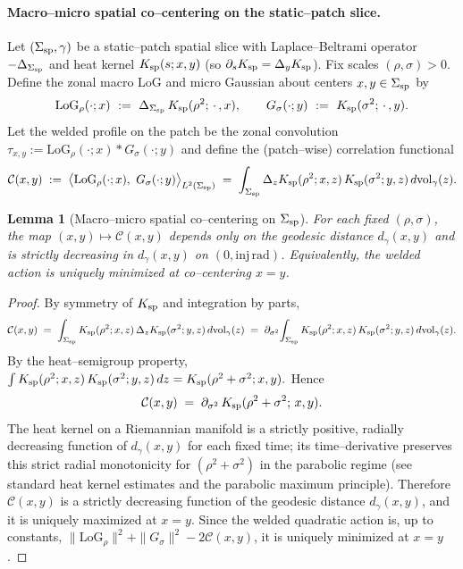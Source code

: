 \documentclass[10pt]{article}
\theoremstyle{definition}
\theoremstyle{plain}
\newtheorem{lemma}{Lemma}[section]
\begin{document}
\paragraph{Macro–micro spatial co–centering on the static–patch slice.}\label{par:uom-main-062}
Let $(\Sigma_{\rm sp},\gamma)$ be a static–patch spatial slice with Laplace–Beltrami operator
$-\Delta_{\Sigma_{\rm sp}}$ and heat kernel $K_{\rm sp}(s;x,y)$ (so $\partial_s K_{\rm sp}=\Delta_y K_{\rm sp}$).
Fix scales $(\rho,\sigma)>0$. Define the zonal macro LoG and micro Gaussian about centers
$x,y\in\Sigma_{\rm sp}$ by
\[
\mathrm{LoG}_\rho(\cdot;x)\ :=\ \Delta_{\Sigma_{\rm sp}}\,K_{\rm sp}(\rho^2;\,\cdot\,,x),\qquad
G_\sigma(\cdot;y)\ :=\ K_{\rm sp}(\sigma^2;\,\cdot\,,y).
\]
Let the welded profile on the patch be the zonal convolution
\(
\tau_{x,y}:=\mathrm{LoG}_\rho(\cdot;x)\ast G_\sigma(\cdot;y)
\)
and define the (patch–wise) correlation functional
\begin{equation}
\label{eq:spatial-corr}
\mathcal C(x,y)\;:=\;\big\langle \mathrm{LoG}_\rho(\cdot;x),\ G_\sigma(\cdot;y)\big\rangle_{L^2(\Sigma_{\rm sp})}
\;=\;\int_{\Sigma_{\rm sp}}\Delta_{z}K_{\rm sp}(\rho^2;x,z)\,K_{\rm sp}(\sigma^2;y,z)\,d\mathrm{vol}_\gamma(z).
\end{equation}

\begin{lemma}[Macro–micro spatial co–centering on $\Sigma_{\rm sp}$]
\label{lem:spatial-cocenter-static}
For each fixed $(\rho,\sigma)$, the map $(x,y)\mapsto \mathcal C(x,y)$ depends only on the geodesic
distance $d_\gamma(x,y)$ and is strictly decreasing in $d_\gamma(x,y)$ on $(0,\mathrm{inj\,rad})$.
Equivalently, the welded action is uniquely minimized at co–centering $x=y$.
\end{lemma}

\begin{proof}
By symmetry of $K_{\rm sp}$ and integration by parts,
\[
\mathcal C(x,y)\;=\;\int_{\Sigma_{\rm sp}}K_{\rm sp}(\rho^2;x,z)\,\Delta_{z}K_{\rm sp}(\sigma^2;y,z)\,d\mathrm{vol}_\gamma(z)
\;=\;\partial_{\sigma^2}\!\int_{\Sigma_{\rm sp}} K_{\rm sp}(\rho^2;x,z)\,K_{\rm sp}(\sigma^2;y,z)\,d\mathrm{vol}_\gamma(z).
\]
By the heat–semigroup property,
\(
\int K_{\rm sp}(\rho^2;x,z)\,K_{\rm sp}(\sigma^2;y,z)\,dz=K_{\rm sp}(\rho^2+\sigma^2;x,y).
\)
Hence
\begin{equation}
\label{eq:kernel-derivative}
\mathcal C(x,y)\;=\;\partial_{\sigma^2}\,K_{\rm sp}(\rho^2+\sigma^2;\,x,y).
\end{equation}
The heat kernel on a Riemannian manifold is a strictly positive, radially decreasing function of
$d_\gamma(x,y)$ for each fixed time; its time–derivative preserves this strict radial monotonicity
for $(\rho^2+\sigma^2)$ in the parabolic regime (see standard heat kernel estimates and the parabolic
maximum principle). Therefore $\mathcal C(x,y)$ is a strictly decreasing function of the geodesic
distance $d_\gamma(x,y)$, and it is uniquely maximized at $x=y$. Since the welded quadratic action is,
up to constants, $\|\mathrm{LoG}_\rho\|^2+\|G_\sigma\|^2-2\mathcal C(x,y)$, it is uniquely minimized at $x=y$.
\end{proof}
\end{document}
